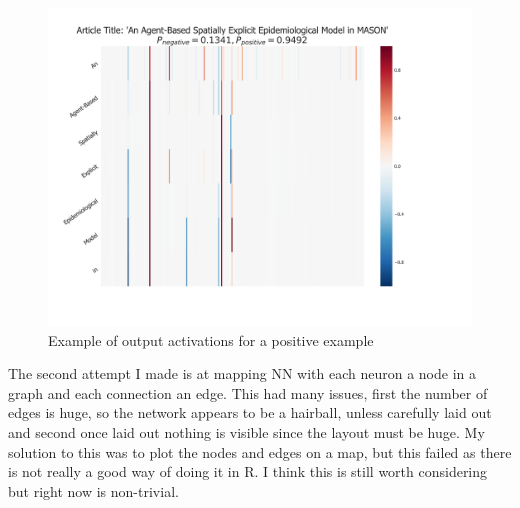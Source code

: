 \documentclass[12pt, a4paper]{article}
\begin{document}
\begin{figure}[ht]
	\centering
	\begin{adjustbox}{center}
		\includegraphics[width=1\textwidth]{activations}
	\end{adjustbox}
	\caption{Example of output activations for a positive example}\label{acts}
\end{figure}

The second attempt I made is at mapping NN with each neuron a node in a graph and each connection an edge. This had many issues, first the number of edges is huge, so the network appears to be a hairball, unless carefully laid out and second once laid out nothing is visible since the layout must be huge. My solution to this was to plot the nodes and edges on a map, but this failed as there is not really a good way of doing it in R. I think this is still worth considering but right now is non-trivial.
\end{document}
